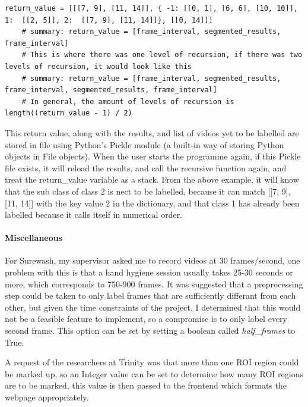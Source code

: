     \begin{lstlisting}[style=PythonStyle]
    return_value = [[[7, 9], [11, 14]], { -1: [[0, 1], [6, 6], [10, 10]], 1:  [[2, 5]], 2:  [[7, 9], [11, 14]]}, [[0, 14]]]
    # summary: return_value = [frame_interval, segmented_results, frame_interval]
    # This is where there was one level of recursion, if there was two levels of recursion, it would look like this
    # summary: return_value = [frame_interval, segmented_results, frame_interval, segmented_results, frame_interval]
    # In general, the amount of levels of recursion is length((return_value - 1) / 2)\end{lstlisting}

    This return value, along with the results, and list of videos yet to be labelled are stored in file using Python's Pickle module (a built-in way of storing Python objects in File objects). When the user starts the programme again, if this Pickle file exists, it will reload the results, and call the recursive function again, and treat the return\_value variable as a stack. From the above example, it will know that the sub class of class 2 is nect to be labelled, because it can match [[7, 9], [11, 14]] with the key value 2 in the dictionary, and that class 1 has already been labelled because it calls itself in numerical order.

    \paragraph{Miscellaneous}
    For Surewash, my supervisor asked me to record videos at 30 frames/second, one problem with this is that a hand hygiene session usually takes 25-30 seconds or more, which corresponds to 750-900 frames. It was suggested that a preprocessing step could be taken to only label frames that are sufficiently differant from each other, but given the time constraints of the project, I determined that this would not be a feasible feature to implement, so a compromise is to only label every second frame. This option can be set by setting a boolean called {\slshape half\_frames} to True.

    A request of the researchers at Trinity was that more than one ROI region could be marked up, so an Integer value can be set to determine how many ROI regions are to be marked, this value is then passed to the frontend which formats the webpage appropriately.

